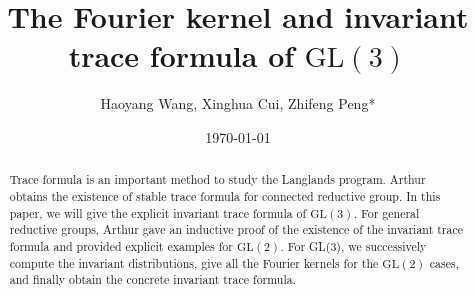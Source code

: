 \documentclass[11pt]{amsart}
\renewcommand{\rm}{\mathrm}
\newcommand{\GGL}{\mathrm{GL}}
\theoremstyle{definition}
\numberwithin{equation}{section}
\begin{document}
	
	
	\title{The Fourier kernel and invariant trace formula of $\rm{GL}(3)$}
	
	\date{\today}
	
	\author{Haoyang Wang, Xinghua Cui, Zhifeng Peng*}
	
	\address{School of Mathematical Science, Soochow University, Suzhou 310027, Jiangsu, P.R. China}
	
	\maketitle
	
	\begin{abstract}
		Trace formula is an important method to study the Langlands program.  Arthur obtains the existence of stable trace formula for connected reductive group. In this paper, we will give the explicit invariant trace formula of $\rm{GL}(3)$. For general reductive groups, Arthur gave an inductive proof of the existence of the invariant trace formula and provided explicit examples for $\GGL(2)$. For GL(3), we successively compute the invariant distributions, give all the Fourier kernels for the $\GGL(2)$ cases, and finally obtain the concrete invariant trace formula.
		
	\end{abstract}

\makeatletter

\def\l@section{\@tocline{1}{3pt}{1pc}{}{\bfseries}}

\def\l@subsection{\@tocline{2}{0pt}{1pc}{5pc}{}}

\def\@tocline#1#2#3#4#5#6#7{%
  \relax
  \ifnum #1>\c@tocdepth
  \else
    \par\addpenalty\@secpenalty\addvspace{#2}%
    \begingroup
    \hyphenpenalty\@M
    \@ifempty{#4}{%
      \@tempdima\csname r@tocindent\number#1\endcsname\relax
    }{%
      \@tempdima#4\relax
    }%
    \parindent\z@
    \leftskip#3\relax
    \advance\leftskip\@tempdima\relax
    \rightskip\@pnumwidth plus4em
    \parfillskip-\@pnumwidth
    #5\leavevmode\hskip-\@tempdima
    #6\nobreak\relax
    \ifnum#1=1
      \hfill
    \else
      \dotfill
    \fi
    \hbox to\@pnumwidth{\@tocpagenum{#7}}\par
    \nobreak
    \endgroup
  \fi
}

\makeatother



    \setcounter{tocdepth}{2}
    \begingroup
{}
\setlength{\parskip}{0pt}
\tableofcontents
\endgroup
	
\end{document}
